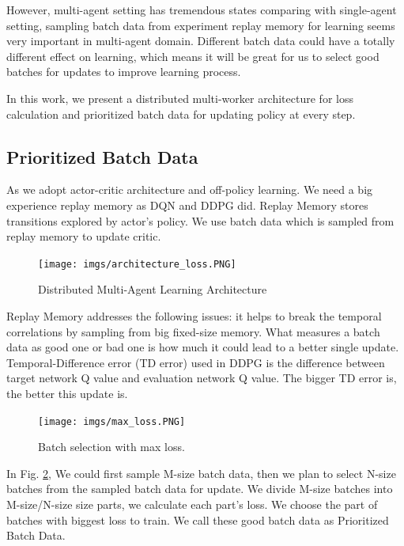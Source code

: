 \documentclass[11pt,twocolumn]{jarticle} %
\begin{document}
However, multi-agent setting has tremendous states comparing with single-agent setting, sampling batch data from experiment replay memory for learning seems very important in multi-agent domain. Different batch data could have a totally different effect on learning, which means it will be great for us to select good batches for updates to improve learning process. \par

In this work, we present a distributed multi-worker architecture for loss calculation and prioritized batch data for updating policy at every step.

\subsection{Prioritized Batch Data}

As we adopt actor-critic architecture and off-policy learning. We need a big experience replay memory as DQN and DDPG did. Replay Memory stores transitions explored by actor's policy. We use batch data which is sampled from replay memory to update critic. \par 

\begin{figure}[ht]
 \begin{center}
  \texttt{[image: imgs/architecture\_loss.PNG]}
  \caption{Distributed Multi-Agent Learning Architecture}
  \label{fig:architecture}
 \end{center}
\end{figure}

Replay Memory addresses the following issues: it helps to break the temporal correlations by sampling from big fixed-size memory. What measures a batch data as good one or bad one is how much it could lead to a better single update. Temporal-Difference error (TD error) used in DDPG is the difference between target network Q value and evaluation network Q value. The bigger TD error is, the better this update is. \par
\begin{figure}[h]
 \begin{center}
  \texttt{[image: imgs/max\_loss.PNG]}
  \caption{
  Batch selection with max loss.
  }
  \label{fig:max_loss}
 \end{center}
\end{figure}


In Fig. \ref{fig:max_loss}, We could first sample M-size batch data, then we plan to select N-size batches from the sampled batch data for update. We divide M-size batches into M-size/N-size size parts, we calculate each part's loss. We choose the part of batches with biggest loss to train. We call these good batch data as Prioritized Batch Data. \par
\end{document}
